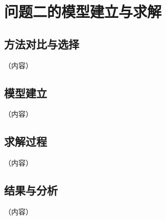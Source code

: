 %
%

\section{问题二的模型建立与求解}

\subsection{方法对比与选择}

（内容）

\subsection{模型建立}

（内容）

\subsection{求解过程}

（内容）

\subsection{结果与分析}

（内容）

\FloatBarrier
